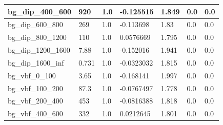 \documentclass[a4paper, 10pt]{article}
\begin{document}
\begin{table}[H]
\begin{center}
\begin{tabular}{|m{23.0mm}|m{23.0mm}|m{18.0mm}|m{19.0mm}|m{19.0mm}|m{19.0mm}|m{19.0mm}|}
      \hline
      {\cellcolor{white}         bg\_dip\_400\_600}& {\cellcolor{white}         920}& {\cellcolor{white}         1.0}& {\cellcolor{white}         -0.125515}& {\cellcolor{white}         1.849}& {\cellcolor{green}         0.0}& {\cellcolor{green}         0.0}\\
      \hline
      {\cellcolor{white}         bg\_dip\_600\_800}& {\cellcolor{white}         269}& {\cellcolor{white}         1.0}& {\cellcolor{white}         -0.113698}& {\cellcolor{white}         1.83}& {\cellcolor{green}         0.0}& {\cellcolor{green}         0.0}\\
      \hline
      {\cellcolor{white}         bg\_dip\_800\_1200}& {\cellcolor{white}         110}& {\cellcolor{white}         1.0}& {\cellcolor{white}         0.0576669}& {\cellcolor{white}         1.795}& {\cellcolor{green}         0.0}& {\cellcolor{green}         0.0}\\
      \hline
      {\cellcolor{white}         bg\_dip\_1200\_1600}& {\cellcolor{white}         7.88}& {\cellcolor{white}         1.0}& {\cellcolor{white}         -0.152016}& {\cellcolor{white}         1.941}& {\cellcolor{green}         0.0}& {\cellcolor{green}         0.0}\\
      \hline
      {\cellcolor{white}         bg\_dip\_1600\_inf}& {\cellcolor{white}         0.731}& {\cellcolor{white}         1.0}& {\cellcolor{white}         -0.0323032}& {\cellcolor{white}         1.815}& {\cellcolor{green}         0.0}& {\cellcolor{green}         0.0}\\
      \hline
      {\cellcolor{white}         bg\_vbf\_0\_100}& {\cellcolor{white}         3.65}& {\cellcolor{white}         1.0}& {\cellcolor{white}         -0.168141}& {\cellcolor{white}         1.997}& {\cellcolor{green}         0.0}& {\cellcolor{green}         0.0}\\
      \hline
      {\cellcolor{white}         bg\_vbf\_100\_200}& {\cellcolor{white}         87.3}& {\cellcolor{white}         1.0}& {\cellcolor{white}         -0.0767497}& {\cellcolor{white}         1.778}& {\cellcolor{green}         0.0}& {\cellcolor{green}         0.0}\\
      \hline
      {\cellcolor{white}         bg\_vbf\_200\_400}& {\cellcolor{white}         453}& {\cellcolor{white}         1.0}& {\cellcolor{white}         -0.0816388}& {\cellcolor{white}         1.818}& {\cellcolor{green}         0.0}& {\cellcolor{green}         0.0}\\
      \hline
      {\cellcolor{white}         bg\_vbf\_400\_600}& {\cellcolor{white}         332}& {\cellcolor{white}         1.0}& {\cellcolor{white}         0.0212645}& {\cellcolor{white}         1.801}& {\cellcolor{green}         0.0}& {\cellcolor{green}         0.0}\\

\end{tabular}
\end{center}
\end{table}
\end{document}
